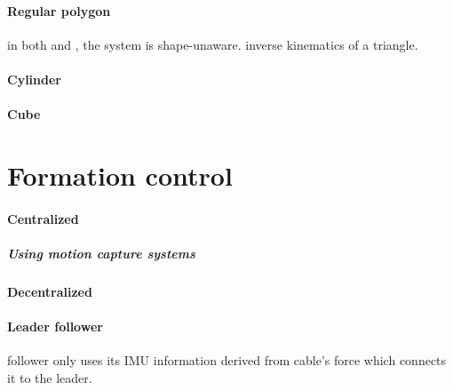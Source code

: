 \documentclass{article}
\begin{document}
		\paragraph{Regular polygon}
			in both \cite{tagliabue-2017-collaborative-transportation-using-mavs-via-passive-force-control}
			and \cite{tagliabue-2017-robust-collaborative-object-transportation-using-multiple-mavs}, the system is shape-unaware. 
			\cite{jiang-2013-the-inverse-kinematics-of-cooperative-transport-with-multiple-aerial-robots} inverse kinematics of a triangle.
			\cite{sreenath-2013-dynamics-control-and-planning-for-cooperative-manipulation-of-payloads-suspended-by-cables-from-multiple-quadrotor-robots}
		\paragraph{Cylinder}
			\cite{mohammadi-2018-decentralized-motion-control-in-a-cabled-based-multi-drone-load-transport-system}
		\paragraph{Cube}
			\cite{masone-2016-cooperative-transportation-of-a-payload-using-quadrotors-a-reconfigurable-cable-driven-parallel-robot}
	\section{Formation control}
		\paragraph{Centralized}
			\cite{nguyen-2015-aerial-tool-operation-system-using-quadrotors-as-rotating-thrust-generators}
			\subparagraph{Using motion capture systems}
			\paragraph{Decentralized}
			
			\paragraph{Leader follower}
			\cite{tagliabue-2017-robust-collaborative-object-transportation-using-multiple-mavs}
			\cite{tagliabue-2017-collaborative-transportation-using-mavs-via-passive-force-control}
			\cite{gassner-2017-dynamic-collaboration-without-communication-vision-based-cable-suspended-load-transport-with-two-quadrotors}
			\cite{loianno-2017-cooperative-transportation-using-small-quadrotors-using-monocular-vision-and-inertial-sensing}
			\cite{wu-2020-cooperative-transportation-of-drones-without-inter-agent-communication}
			\cite{chen-2019-cooperative-transportation-of-cable-suspended-slender-payload-using-two-quadrotors}
			\cite{xie-2020-towards-cooperative-transport-of-a-suspended-payload-via-two-aerial-robots-with-inertial-sensing} follower only uses its IMU information derived from cable's force which connects it to the leader.
\end{document}
